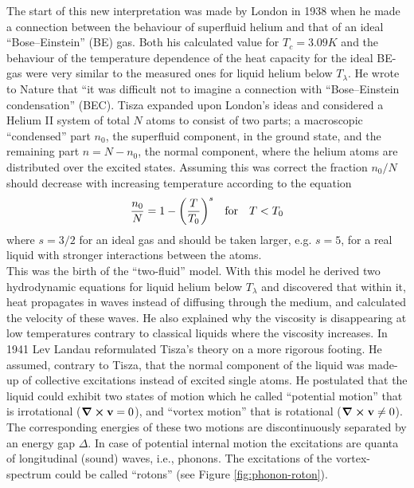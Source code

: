 		The start of this new interpretation was made by London\citep{London1938} in 1938 when he made a connection between the behaviour of superfluid helium and that of an ideal ``Bose--Einstein'' (BE) gas. Both his calculated value for $T_c=3.09\unit{K}$ and the behaviour of the temperature dependence of the heat capacity for the ideal BE-gas were very similar to the measured ones for liquid helium below $T_\lambda$. He wrote to Nature that ``it was difficult not to imagine a connection with ``Bose--Einstein condensation'' (BEC). Tisza expanded upon London's ideas\citep{Tisza1938} and considered a Helium II system of total $N$ atoms to consist of two parts; a macroscopic ``condensed'' part $n_0$, the superfluid component, in the ground state, and the remaining part $n=N-n_0$, the normal component, where the helium atoms are distributed over the excited states. Assuming this was correct the fraction $n_0/N$ should decrease with increasing temperature according to the equation\\
		\begin{align}
			\frac{n_0}{N} = 1-\qty(\frac{T}{T_0})^s \quad \text{for} \quad T<T_0
		\end{align}
		where $s=3/2$ for an ideal gas and should be taken larger, e.g. $s=5$, for a real liquid with stronger interactions between the atoms.\\
		
		This was the birth of the ``two-fluid'' model. With this model he derived two hydrodynamic equations for liquid helium below $T_\lambda$ and discovered that within it, heat propagates in waves instead of diffusing through the medium, and calculated the velocity of these waves. He also explained why the viscosity is disappearing at low temperatures contrary to classical liquids where the viscosity increases\citep{Tisza1938-1,Tisza1938-2,Tisza1940-1,Tisza1940-2}. In 1941 Lev Landau reformulated Tisza's theory on a more rigorous footing\citep{Landau1941,Landau1949}. He assumed, contrary to Tisza, that the normal component of the liquid was made-up of collective excitations instead of excited single atoms. He postulated that the liquid could exhibit two states of motion which he called ``potential motion'' that is irrotational ($\curl{\bm{\mathrm{v}}}=0$), and ``vortex motion'' that is rotational ($\curl{\bm{\mathrm{v}}} \neq 0$). The corresponding energies of these two motions are discontinuously separated by an energy gap $\Delta$. In case of potential internal motion  the excitations are quanta of longitudinal (sound) waves, i.e., phonons. The excitations of the vortex-spectrum could be called ``rotons'' (see Figure \ref{fig:phonon-roton}).\\

